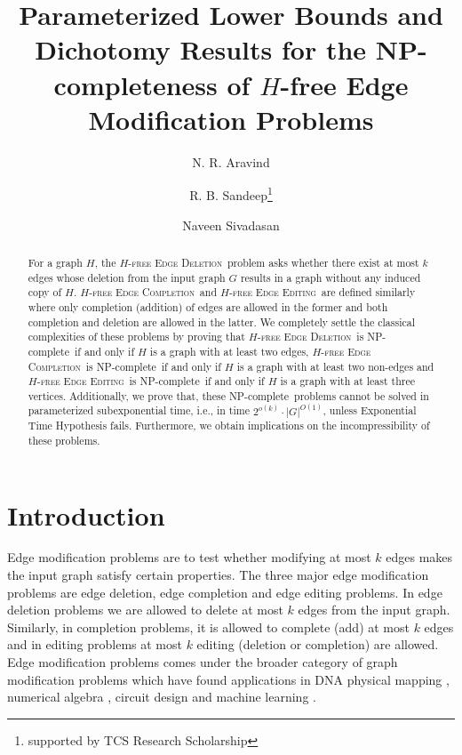 \documentclass[envcountsame,envcountsect,10pt,oribibl]{llncs}
\newcommand{\pname}[1]{\textnormal{\textsc{#1}}}
\newcommand{\cclass}[1]{\textnormal{\textsf{#1}}}
\newcommand{\HED}{\pname{$H$-free Edge Deletion}}
\newcommand{\HEC}{\pname{$H$-free Edge Completion}}
\newcommand{\HEE}{\pname{$H$-free Edge Editing}}
\newcommand{\NPC}{\cclass{NP-complete}}
\begin{document}
\mainmatter              \title{Parameterized Lower Bounds and Dichotomy Results for the NP-completeness of $H$-free Edge Modification Problems}
\author{N. R. Aravind \and R. B. Sandeep\thanks{supported by TCS Research Scholarship} \and Naveen Sivadasan}

\maketitle              \begin{abstract}
For a graph $H$, the \HED\ problem asks whether there exist at most $k$ 
edges whose deletion from the input graph $G$ 
results in a graph without any induced copy of $H$. 
\HEC\ and \HEE\ are defined similarly where
only completion (addition) of edges are allowed in the former and 
both completion and deletion are allowed in the latter. 
We completely settle the classical complexities of these problems by proving that
\HED\ is \NPC\ if and only if $H$ is a graph with at least two edges, 
\HEC\ is \NPC\ if and only if $H$ is a graph with at least two non-edges and
\HEE\ is \NPC\ if and only if $H$ is a graph with at least three vertices.
Additionally, we prove that, these \NPC\ problems cannot be 
solved in parameterized subexponential time, i.e., 
in time $2^{o(k)}\cdot |G|^{O(1)}$, unless Exponential Time Hypothesis fails.
Furthermore, we obtain implications on the incompressibility of these 
problems.
\end{abstract}
\section{Introduction}
\label{sec:introduction}

Edge modification problems are to test whether modifying at most $k$ edges
makes the input graph satisfy certain properties. The three major edge modification
problems are edge deletion, edge completion and edge editing problems.
In edge deletion problems we are allowed to delete at most $k$ edges from
the input graph. Similarly, in completion problems, it is allowed to
complete (add) at most $k$ edges and in editing problems at most
$k$ editing (deletion or completion) are allowed. Edge modification problems
comes under the broader category of graph modification problems which have
found applications in DNA physical mapping 
\cite{goldberg1995four},
numerical algebra \cite{rose1972graph}, circuit design \cite{el1988complexity}
and machine learning \cite{DBLP:journals/ml/BansalBC04}.
\end{document}
